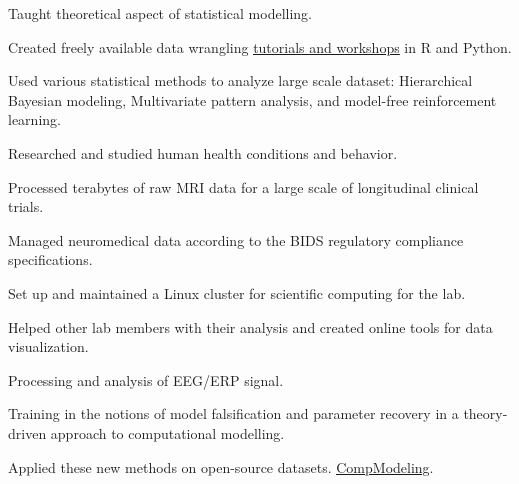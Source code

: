 \documentclass[]{plushcv}
\begin{document}
\begin{minipage}[t]{0.70\textwidth}
\begin{tightemize}
\sectionsep
\sectionsep
\item Taught theoretical aspect of statistical modelling.
\item Created freely available data wrangling
\href{https://munoztd0.github.io/Hitchhikers_guide_to_the_brain/}{\underline{tutorials and workshops}} in R and Python.
\end{tightemize}
\sectionsep

\sectionsep
{}
\begin{tightemize}
\item Used various statistical methods to analyze large
scale dataset: Hierarchical Bayesian modeling,
Multivariate pattern analysis, and model-free reinforcement
learning.
\item Researched and studied human health conditions
and behavior.
\item Processed terabytes of raw MRI data for a large scale of
longitudinal clinical trials.
\item Managed neuromedical data according to
the BIDS regulatory compliance specifications.
\item Set up and maintained a Linux cluster for
scientific computing for the lab.
\item Helped other lab members with their analysis and
created online tools for data visualization.
\end{tightemize}
\sectionsep


\sectionsep
{}
\begin{tightemize}
\item Processing and analysis of EEG/ERP signal.
\item Training in the notions of model falsification and
parameter recovery in a theory-driven approach to computational modelling. 
\item Applied these new methods on open-source datasets. \href{https://github.com/munoztd0/Computational-Modelling}{\underline{CompModeling}}.
\end{tightemize}



\end{minipage}
\end{document}
